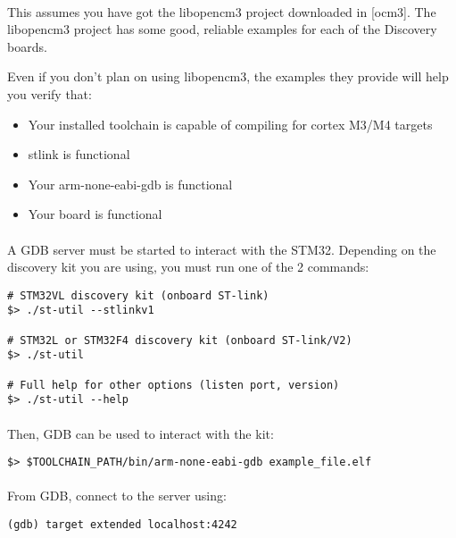 \documentclass[a4paper, 11pt]{article}
\begin{document}
\paragraph{}
This assumes you have got the libopencm3 project downloaded in [ocm3].  The
libopencm3 project has some good, reliable examples for each of the Discovery boards.

Even if you don't plan on using libopencm3, the examples they provide will help you 
verify that:

\begin{itemize}
\item Your installed toolchain is capable of compiling for cortex M3/M4 targets
\item stlink is functional
\item Your arm-none-eabi-gdb is functional
\item Your board is functional
\end{itemize}

\paragraph{}
A GDB server must be started to interact with the STM32. Depending on the discovery kit you
are using, you must run one of the 2 commands:\\
\begin{small}
\begin{lstlisting}[frame=tb]
# STM32VL discovery kit (onboard ST-link)
$> ./st-util --stlinkv1

# STM32L or STM32F4 discovery kit (onboard ST-link/V2)
$> ./st-util 

# Full help for other options (listen port, version)
$> ./st-util --help
\end{lstlisting}
\end{small}

\paragraph{}
Then, GDB can be used to interact with the kit:\\
\begin{small}
\begin{lstlisting}[frame=tb]
$> $TOOLCHAIN_PATH/bin/arm-none-eabi-gdb example_file.elf
\end{lstlisting}
\end{small}

\paragraph{}
From GDB, connect to the server using:\\
\begin{small}
\begin{lstlisting}[frame=tb]
(gdb) target extended localhost:4242
\end{lstlisting}
\end{small}
\end{document}

